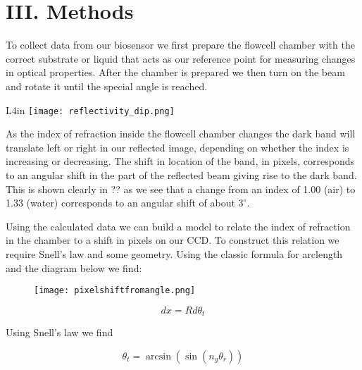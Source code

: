 \section*{III. Methods}
\hspace{0.25in}
To collect data from our biosensor we first prepare the flowcell chamber with the correct substrate or liquid that acts as our reference point for measuring changes in optical properties. After the chamber is prepared we then turn on the beam and rotate it until the special angle is reached. 

\begin{wrapfigure}{L}{4in}
    \texttt{[image: reflectivity\_dip.png]}
\end{wrapfigure}

As the index of refraction inside the flowcell chamber changes the dark band will translate left or right in our reflected image, depending on whether the index is increasing or decreasing. The shift in location of the band, in pixels, corresponds to an angular shift in the part of the reflected beam giving rise to the dark band. This is shown clearly in ?? as we see that a change from an index of 1.00 (air) to 1.33 (water) corresponds to an angular shift  of about $3^\circ$.


Using the calculated data we can build a model to relate the index of refraction in the chamber to a shift in pixels on our CCD. To construct this relation we require Snell's law and some geometry. Using the classic formula for arclength and the diagram below we find:\\

\begin{figure}[h!]
\begin{center}
\texttt{[image: pixelshiftfromangle.png]}
\end{center}
\end{figure}

\begin{equation*}
	dx = R d\theta_t
\end{equation*}

Using Snell's law we find

\begin{equation*}
	\theta_t = \arcsin(\sin(n_g \theta_r))
\end{equation*}

